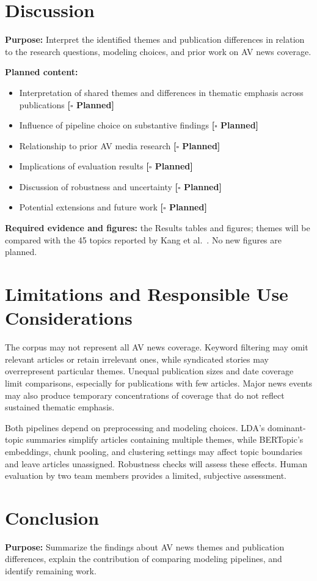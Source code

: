 \documentclass[conference]{IEEEtran}
\newcommand{\planned}{\textcolor{blue!60!black}{\textbf{[$\square$ Planned]}}}
\begin{document}
\section*{Discussion}
\textbf{Purpose:} Interpret the identified themes and publication differences in relation to the research questions, modeling choices, and prior work on AV news coverage.

\textbf{Planned content:}
\begin{itemize}
    \item Interpretation of shared themes and differences in thematic emphasis across publications \planned
    \item Influence of pipeline choice on substantive findings \planned
    \item Relationship to prior AV media research \planned
    \item Implications of evaluation results \planned
    \item Discussion of robustness and uncertainty \planned
    \item Potential extensions and future work \planned
\end{itemize}

\textbf{Required evidence and figures:} the Results tables and figures; themes will be compared with the 45 topics reported by Kang et al.~\cite{kang2025unveiling}. No new figures are planned.

\section*{Limitations and Responsible Use Considerations}
The corpus may not represent all AV news coverage. Keyword filtering may omit relevant articles or retain irrelevant ones, while syndicated stories may overrepresent particular themes. Unequal publication sizes and date coverage limit comparisons, especially for publications with few articles. Major news events may also produce temporary concentrations of coverage that do not reflect sustained thematic emphasis.

Both pipelines depend on preprocessing and modeling choices. LDA's dominant-topic summaries simplify articles containing multiple themes, while BERTopic's embeddings, chunk pooling, and clustering settings may affect topic boundaries and leave articles unassigned. Robustness checks will assess these effects. Human evaluation by two team members provides a limited, subjective assessment.

\section*{Conclusion}
\textbf{Purpose:} Summarize the findings about AV news themes and publication differences, explain the contribution of comparing modeling pipelines, and identify remaining work.
\end{document}

